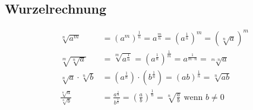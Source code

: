 \documentclass[german]{latex4ei/latex4ei_sheet}
\begin{document}
\begin{sectionbox}

\subsection{Wurzelrechnung}

\begin{align*}
	\sqrt[n]{{a}^{m}} &= {\left({a}^{m} \right)}^{\frac{1}{n}} = {a}^{\frac{m}{n}} = {\left({a}^{\frac{1}{n}} \right)}^{m} = {\left(\sqrt[n]{a}\right)}^{m} \\
	\sqrt[m]{\sqrt[n]{a}} &= \sqrt[m]{{a}^{\frac{1}{n}}} = { \left( {a}^{\frac{1}{n}} \right) }^{ \frac{1}{m} } = {a}^{\frac{1}{m \cdot n}} = \sqrt[m \cdot n]{a} \\
	\sqrt[n]{a} \cdot \sqrt[n]{b} &= \left({a}^{\frac{1}{n}} \right) \cdot \left( {b}^{\frac{1}{n}} \right) = { \left( ab \right) }^{ \frac{1}{n} } = \sqrt[n]{ab} \\
\frac{ \sqrt[n]{a} }{ \sqrt[n]{b} } &= \frac{ {a}^{ \frac{1}{n} } }{ {b}^{ \frac{1}{n} } } = { \left( \frac{a}{b} \right) }^{\frac{1}{n}} = \sqrt[n]{ \frac{a}{b} } \text{   wenn } b  \neq 0	
\end{align*}


\end{sectionbox}
\end{document}
